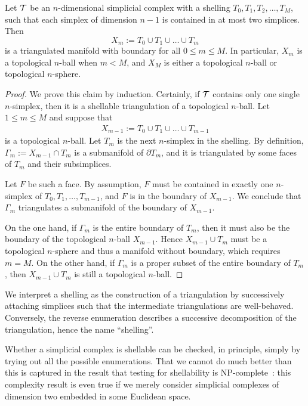 \documentclass[10pt,a4paper]{article}
\begin{document}
\begin{lemma}\label{lemma:shell_triang_man}
    Let ${\mathcal T}$ be an $n$-dimensional simplicial complex 
    with a shelling $T_{0}, T_{1}, T_{2}, \dots, T_{M}$,
    such that each simplex of dimension $n-1$ is contained in at most two simplices. 
    Then
    $$
        X_{m} := T_{0} \cup T_{1} \cup \dots \cup T_{m}
    $$ 
    is a triangulated manifold with boundary for all $0 \leq m \leq M$.
    In particular, $X_{m}$ is a topological $n$-ball when $m < M$, 
    and 
    $X_{M}$ is either a topological $n$-ball or topological $n$-sphere. 
\end{lemma}
\begin{proof}  
    We prove this claim by induction. 
    Certainly, if ${\mathcal T}$ contains only one single $n$-simplex, then it is a shellable triangulation of a topological $n$-ball. Let $1 \leq m \leq M$ and suppose that 
    \begin{align*}
        X_{m-1} := T_{0} \cup T_{1} \cup \dots \cup T_{m-1}
    \end{align*}
    is a topological $n$-ball. Let $T_{m}$ is the next $n$-simplex in the shelling.
    By definition, $\Gamma_{m} := X_{m-1} \cap T_{m}$ is a submanifold of $\partial T_{m}$,
    and it is triangulated by some faces of $T_{m}$ and their subsimplices. 
    
    Let $F$ be such a face. 
    By assumption, $F$ must be contained in exactly one $n$-simplex of $T_{0}, T_{1}, \dots, T_{m-1}$,
    and $F$ is in the boundary of $X_{m-1}$. 
    We conclude that $\Gamma_{m}$ triangulates a submanifold of the boundary of $X_{m-1}$.
    
    On the one hand, 
    if $\Gamma_{m}$ is the entire boundary of $T_{m}$, 
    then it must also be the boundary of the topological $n$-ball $X_{m-1}$. 
    Hence $X_{m-1} \cup T_{m}$ must be a topological $n$-sphere and thus a manifold without boundary, 
    which requires $m = M$.
    On the other hand, 
    if $\Gamma_{m}$ is a proper subset of the entire boundary of $T_{m}$, 
    then $X_{m-1} \cup T_{m}$ is still a topological $n$-ball.
\end{proof}


\begin{remark}
    We interpret a shelling as the construction of a triangulation 
    by successively attaching simplices such that the intermediate triangulations are well-behaved. 
    Conversely, the reverse enumeration describes a successive decomposition of the triangulation, hence the name ``shelling''.
\end{remark}
\begin{remark}
    Whether a simplicial complex is shellable can be checked, in principle, simply by trying out all the possible enumerations.
    That we cannot do much better than this is captured in the result that testing for shellability is NP-complete~\cite{goaoc2019shellability}:
    this complexity result is even true if we merely consider simplicial complexes of dimension two embedded in some Euclidean space.
\end{remark}
\end{document}
